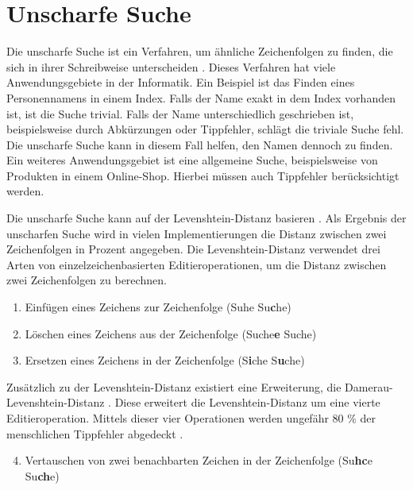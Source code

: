 \section{Unscharfe Suche}
\label{sec:unscharfe-suche}
Die unscharfe Suche ist ein Verfahren, um ähnliche Zeichenfolgen zu finden, die sich in ihrer Schreibweise unterscheiden \autocite{hall_approximate_1980}.
Dieses Verfahren hat viele Anwendungsgebiete in der Informatik.
Ein Beispiel ist das Finden eines Personennamens in einem Index.
Falls der Name exakt in dem Index vorhanden ist, ist die Suche trivial.
Falls der Name unterschiedlich geschrieben ist, beispielsweise durch Abkürzungen oder Tippfehler, schlägt die triviale Suche fehl.
Die unscharfe Suche kann in diesem Fall helfen, den Namen dennoch zu finden.
Ein weiteres Anwendungsgebiet ist eine allgemeine Suche, beispielsweise von Produkten in einem Online-Shop.
Hierbei müssen auch Tippfehler berücksichtigt werden.

Die unscharfe Suche kann auf der Levenshtein-Distanz basieren \autocite{levenshtein_binary_1965}.
Als Ergebnis der unscharfen Suche wird in vielen Implementierungen die Distanz zwischen zwei Zeichenfolgen in Prozent angegeben.
Die Levenshtein-Distanz verwendet drei Arten von einzelzeichenbasierten Editieroperationen, um die Distanz zwischen zwei Zeichenfolgen zu berechnen.

\begin{enumerate}
    \item Einfügen eines Zeichens zur Zeichenfolge (Suhe \rightarrow{} Su\textbf{c}he)
    \item Löschen eines Zeichens aus der Zeichenfolge (Suche\textbf{e} \rightarrow{} Suche)
    \item Ersetzen eines Zeichens in der Zeichenfolge (S\textbf{i}che \rightarrow{} S\textbf{u}che)
\end{enumerate}

Zusätzlich zu der Levenshtein-Distanz existiert eine Erweiterung, die Damerau-Levenshtein-Distanz \autocite{damerau_technique_1964}.
Diese erweitert die Levenshtein-Distanz um eine vierte Editieroperation.
Mittels dieser vier Operationen werden ungefähr 80 \% der menschlichen Tippfehler abgedeckt \autocite{damerau_technique_1964}.

\begin{enumerate}
    \setcounter{enumi}{3}
    \item Vertauschen von zwei benachbarten Zeichen in der Zeichenfolge (Su\textbf{hc}e \rightarrow{} Su\textbf{ch}e)
\end{enumerate}

